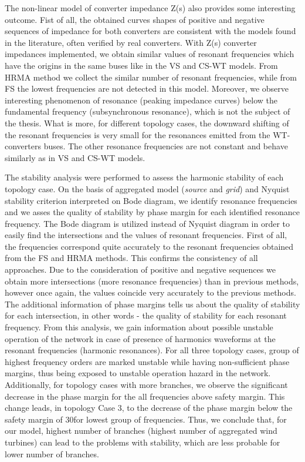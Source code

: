 \documentclass[a4paper,11pt,oneside]{report} %
\begin{document}
The non-linear model of converter impedance Z(s) also provides some interesting outcome. Fist of all, the obtained curves shapes of positive and negative sequences of impedance for both converters are consistent with the models found in the literature, often verified by real converters. With Z(s) converter impedances implemented, we obtain similar values of resonant frequencies which have the origins in the same buses like in the VS and CS-WT models. From HRMA method we collect the similar number of resonant frequencies, while from FS the lowest frequencies are not detected in this model. Moreover, we observe interesting phenomenon of resonance (peaking impedance curves) below the fundamental frequency (subsynchronous resonance), which is not the subject of the thesis. What is more, for different topology cases, the downward shifting of the resonant frequencies is very small for the resonances emitted from the WT-converters buses. The other resonance frequencies are not constant and behave similarly as in VS and CS-WT models.

The stability analysis were performed to assess the harmonic stability of each topology case. On the basis of aggregated model (\textit{source} and \textit{grid}) and Nyquist stability criterion interpreted on Bode diagram, we identify resonance frequencies and we asses the quality of stability by phase margin for each identified resonance frequency. The Bode diagram is utilized instead of Nyquist diagram in order to easily find the intersections and the values of resonant frequencies. First of all, the frequencies correspond quite accurately to the resonant frequencies obtained from the FS and HRMA methods. This confirms the consistency of all approaches. Due to the consideration of positive and negative sequences we obtain more intersections (more resonance frequencies) than in previous methods, however once again, the values coincide very accurately to the previous methods. The additional information of phase margins tells us about the quality of stability for each intersection, in other words - the quality of stability for each resonant frequency. From this analysis, we gain information about possible unstable operation of the network in case of presence of harmonics waveforms at the resonant frequencies (harmonic resonances). For all three topology cases, group of highest frequency orders are marked unstable while having non-sufficient phase margins, thus being exposed to unstable operation hazard in the network. Additionally, for topology cases with more branches, we observe the significant decrease in the phase margin for the all frequencies above safety margin. This change leads, in topology Case 3, to the decrease of the phase margin below the safety margin of 30\degree for lowest group of frequencies. Thus, we conclude that, for our model, highest number of branches (highest number of aggregated wind turbines) can lead to the problems with stability, which are less probable for lower number of branches.
\end{document}
